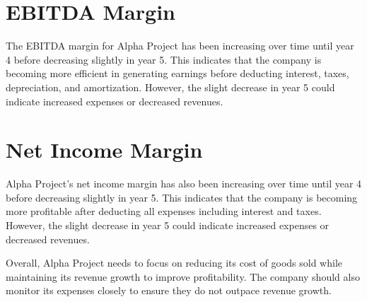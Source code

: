 \section{EBITDA Margin}

The EBITDA margin for Alpha Project has been increasing over time until year 4 before decreasing slightly in year 5. This indicates that the company is becoming more efficient in generating earnings before deducting interest, taxes, depreciation, and amortization. However, the slight decrease in year 5 could indicate increased expenses or decreased revenues.

\section{Net Income Margin}

Alpha Project's net income margin has also been increasing over time until year 4 before decreasing slightly in year 5. This indicates that the company is becoming more profitable after deducting all expenses including interest and taxes. However, the slight decrease in year 5 could indicate increased expenses or decreased revenues.

Overall, Alpha Project needs to focus on reducing its cost of goods sold while maintaining its revenue growth to improve profitability. The company should also monitor its expenses closely to ensure they do not outpace revenue growth.